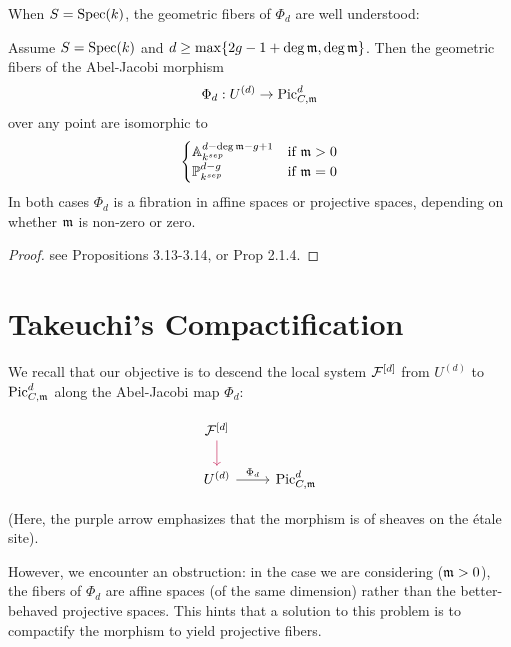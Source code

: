 When $S=\Spec (k)$, the geometric fibers of $\Phi_d$ are well understood:
\begin{theorem}\label{theorem:abel_jacobi_fibers}
    Assume $S=\Spec (k)$ and $d \geq \max \{2g - 1 + \deg \mdls, \deg \mdls\}$. Then the geometric fibers of the Abel-Jacobi morphism $$ \Phi_d : U^{(d)} \to \PicCm[d] $$ over any point are isomorphic to
$$
\begin{cases}
\mathbb{A}_{k^{sep}}^{d - \deg \mdls - g + 1} & \text{if } \mdls > 0 \\
\mathbb{P}_{k^{sep}}^{d - g} & \text{if } \mdls = 0
\end{cases}
$$
In both cases $\Phi_d$ is a fibration in affine spaces or projective spaces, depending on whether $\mdls$ is non-zero or zero.
\end{theorem}
\begin{proof}
see \cite{tendler2015geometricclassfieldtheory} Propositions 3.13-3.14, or \cite{Toth2011} Prop 2.1.4.
\end{proof}


\section{Takeuchi's Compactification}\label{section:BlowupOfSymmetricPowerOfCurves}
We recall that our objective is to descend the local system $\cF^{[d]}$ from $U^{(d)}$ to $\PicCm[d]$ along the
Abel-Jacobi map $\Phi_d$:

\[
\begin{tikzcd}
 \cF^{[d]} \arrow[d, purple]\\
 U^{(d)} \arrow[r, "\Phi_d"] & \PicCm[d]
\end{tikzcd}
\]


(Here, the purple arrow emphasizes that the morphism is of sheaves on the étale site).

However, we encounter an obstruction: in the case we are considering ($\mdls > 0$),
the fibers of $\Phi_d$ are affine spaces (of the same dimension) rather than the better-behaved projective spaces.
This hints that a solution to this problem is to compactify the morphism to yield projective fibers.

